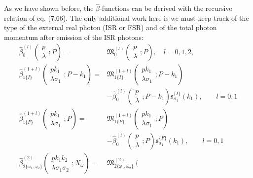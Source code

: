 As we have shown before, the $\hat{\beta}$-functions can be derived with the recursive relation of eq. (7.66). The only additional work here is we must keep track of the type of the external real photon (ISR or FSR) and of the total photon momentum after emission of the ISR photons:
\begin{align}
\hat{\beta}_0^{(l)}\left(\begin{array}{c}
p\\\lambda
\end{array};P\right)=&\mathfrak{M}^{(l)}_0\left(\begin{array}{c}
p\\\lambda
\end{array};P\right),\quad l=0,1,2,\nonumber\\
\hat{\beta}_{1\{I\}}^{(1+l)}\left(\begin{array}{c}
pk_1\\\lambda\sigma_1
\end{array};P-k_1\right)=&\mathfrak{M}^{(1+l)}_{1\{I\}}\left(\begin{array}{c}
pk_1\\\lambda\sigma_1
\end{array};P-k_1\right)
\nonumber\\
&-\hat{\beta}_0^{(l)}\left(\begin{array}{c}
p\\\lambda
\end{array};P-k_1\right)\mathfrak{s}^{\{I\}}_{\sigma_1}(k_1),  \qquad l=0,1\nonumber\\
\hat{\beta}_{1\{F\}}^{(1+l)}\left(\begin{array}{c}
pk_1\\\lambda\sigma_1
\end{array};P\right)=&\mathfrak{M}^{(1+l)}_{1\{F\}}\left(\begin{array}{c}
pk_1\\\lambda\sigma_1
\end{array};P\right)\nonumber\\
&-\hat{\beta}_0^{(l)}\left(\begin{array}{c}
p\\\lambda
\end{array};P\right)\mathfrak{s}^{\{F\}}_{\sigma_1}(k_1),\qquad l=0,1\nonumber\\
\hat{\beta}_{2\{\omega_1,\omega_2\}}^{(2)}\left(\begin{array}{c}
pk_1k_2\\\lambda\sigma_1\sigma_2
\end{array};X_\omega\right)=&\mathfrak{M}^{(2)}_{2\{\omega_1,\omega_2\}}\left(\begin{array}{c}

\end{array}
\end{align}
